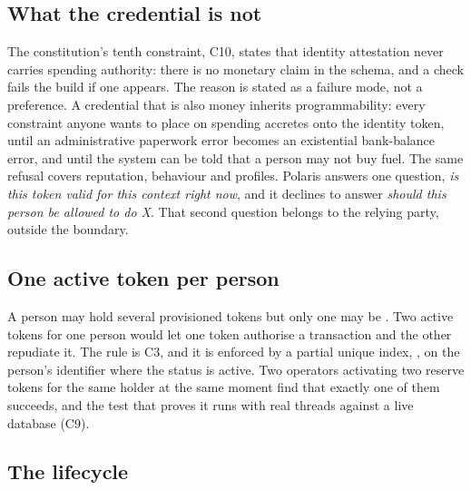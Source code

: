 \subsection{What the credential is not}

The constitution's tenth constraint, C10, states that identity attestation never carries spending
authority: there is no monetary claim in the schema, and a check fails the build if one appears. The
reason is stated as a failure mode, not a preference. A credential that is also money inherits
programmability: every constraint anyone wants to place on spending accretes onto the identity token,
until an administrative paperwork error becomes an existential bank-balance error, and until the
system can be told that a person may not buy fuel. The same refusal covers reputation, behaviour and
profiles. Polaris answers one question, \emph{is this token valid for this context right now}, and
it declines to answer \emph{should this person be allowed to do X}. That second question belongs to
the relying party, outside the boundary. \sImpl

\subsection{One active token per person}

A person may hold several provisioned tokens but only one may be . Two active tokens for
one person would let one token authorise a transaction and the other repudiate it. The rule is C3,
and it is enforced by a partial unique index, , on the person's
identifier where the status is active. Two operators activating two reserve tokens for the same
holder at the same moment find that exactly one of them succeeds, and the test that proves it runs
with real threads against a live database (C9). \sImpl

\subsection{The lifecycle}


